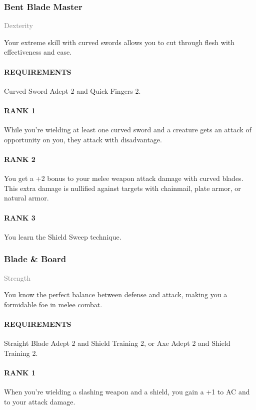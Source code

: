 \subsubsection{Bent Blade Master} \label{feat::bentblademaster}
\small{\textcolor{gray}{Dexterity}}

\normalsize
Your extreme skill with curved swords allows you to cut through flesh with effectiveness and ease.
\paragraph{REQUIREMENTS} Curved Sword Adept 2 and Quick Fingers 2.
\paragraph{RANK 1} While you're wielding at least one curved sword and a creature gets an attack of opportunity on you, they attack with disadvantage.
\paragraph{RANK 2} You get a +2 bonus to your melee weapon attack damage with curved blades.
This extra damage is nullified against targets with chainmail, plate armor, or natural armor.
\paragraph{RANK 3} You learn the Shield Sweep technique.

\subsubsection{Blade \& Board} \label{feat::bladeandboard}
\small{\textcolor{gray}{Strength}}

\normalsize
You know the perfect balance between defense and attack, making you a formidable foe in melee combat.
\paragraph{REQUIREMENTS} Straight Blade Adept 2 and Shield Training 2, or Axe Adept 2 and Shield Training 2.
\paragraph{RANK 1} When you're wielding a slashing weapon and a shield, you gain a +1 to AC and to your attack damage.
